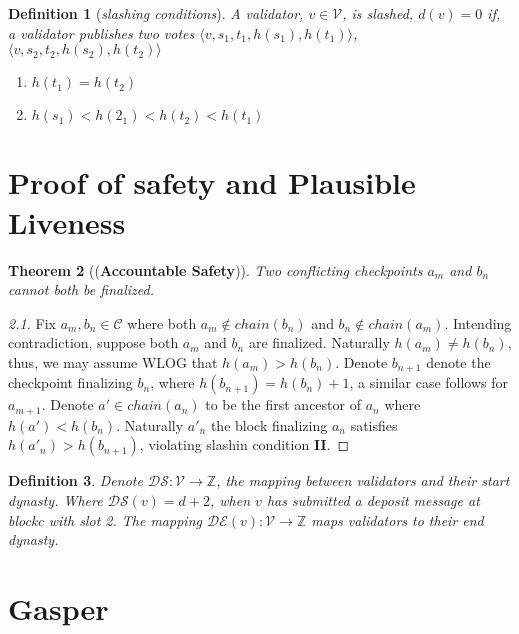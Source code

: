 \documentclass{amsart}
\numberwithin{equation}{section}
\theoremstyle{plain}
\newtheorem{thm}{Theorem}[section]
\newtheorem{dfn}[thm]{Definition}
\theoremstyle{definition}
\begin{document}
\begin{dfn}[\textit{slashing conditions}]
  A validator, $v \in \mathcal{V}$, is slashed, $d(v) = 0$ if, a validator publishes two votes $\langle v, s_1, t_1, h(s_1), h(t_1) \rangle$, $\langle v, s_2, t_2, h(s_2), h(t_2) \rangle$
  \begin{enumerate}
    \item[(1)] $h(t_1) = h(t_2)$ \\
    \item[(2)] $h(s_1) < h(2_1) < h(t_2) < h(t_1)$
  \end{enumerate}
\end{dfn}
\section{Proof of safety and Plausible Liveness}
\begin{thm}[(\textbf{Accountable Safety})]
    Two conflicting checkpoints $a_m$ and $b_n$ cannot both be finalized.
\end{thm}
\begin{proof}[2.1]
Fix $a_m, b_n \in \mathcal{C}$ where both $a_m \not \in chain(b_n)$ and $b_n \not \in chain(a_m)$. Intending contradiction, suppose both $a_m$ and $b_n$ are finalized. Naturally $h(a_m) \not= h(b_n)$, thus, we may assume WLOG that $h(a_m) > h(b_n)$. Denote $b_{n + 1}$ denote the checkpoint finalizing $b_n$, where $h(b_{n+1}) = h(b_n) + 1$, a similar case follows for $a_{m+1}$. Denote $a' \in chain(a_n)$ to be the first ancestor of $a_n$ where $h(a') < h(b_n)$. Naturally $a'_n$ the block finalizing $a_n$ satisfies $h(a'_n) > h(b_{n+1})$, violating slashin condition \textbf{II}.
\end{proof}
  
\begin{dfn}
  Denote $\mathcal{DS}: \mathcal{V} \rightarrow \mathbb{Z}$, the mapping between validators and their start dynasty. Where $\mathcal{DS}(v) = d + 2$, when $v$ has submitted a deposit message at blockc with slot 2. The mapping $\mathcal{DE}(v): \mathcal{V} \rightarrow \mathbb{Z}$ maps validators to their end dynasty. 
\end{dfn}

\section{Gasper}
\end{document}
